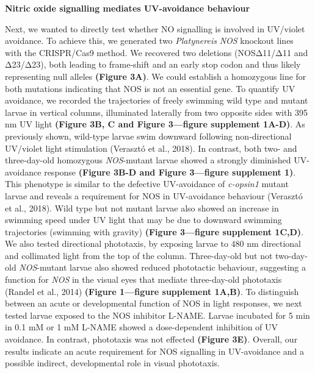\documentclass[
  10pt,
  onecolumn]{article}
\begin{document}
\textbf{Nitric oxide signalling mediates UV-avoidance behaviour}

Next, we wanted to directly test whether NO signalling is involved in
UV/violet avoidance. To achieve this, we generated two
\emph{Platynereis} \emph{NOS} knockout lines with the CRISPR/Cas9
method. We recovered two deletions (NOSΔ11/Δ11 and Δ23/Δ23), both
leading to frame-shift and an early stop codon and thus likely
representing null alleles \textbf{(Figure 3A)}. We could establish a
homozygous line for both mutations indicating that NOS is not an
essential gene. To quantify UV avoidance, we recorded the trajectories
of freely swimming wild type and mutant larvae in vertical columns,
illuminated laterally from two opposite sides with 395 nm UV light
\textbf{(Figure 3B, C and Figure 3---figure supplement 1A-D)}. As
previously shown, wild-type larvae swim downward following
non-directional UV/violet light stimulation (Verasztó et al., 2018). In
contrast, both two- and three-day-old homozygous \emph{NOS}-mutant
larvae showed a strongly diminished UV-avoidance response
\textbf{(Figure 3B-D and Figure 3---figure supplement 1)}. This
phenotype is similar to the defective UV-avoidance of \emph{c-opsin1}
mutant larvae and reveals a requirement for NOS in UV-avoidance
behaviour (Verasztó et al., 2018). Wild type but not mutant larvae also
showed an increase in swimming speed under UV light that may be due to
downward swimming trajectories (swimming with gravity) \textbf{(Figure
3---figure supplement 1C,D)}. We also tested directional phototaxis, by
exposing larvae to 480 nm directional and collimated light from the top
of the column. Three-day-old but not two-day-old \emph{NOS}-mutant
larvae also showed reduced phototactic behaviour, suggesting a function
for \emph{NOS} in the visual eyes that mediate three-day-old phototaxis
(Randel et al., 2014) \textbf{(Figure 1---figure supplement 1A,B)}. To
distinguish between an acute or developmental function of NOS in light
responses, we next tested larvae exposed to the NOS inhibitor L-NAME.
Larvae incubated for 5 min in 0.1 mM or 1 mM L-NAME showed a
dose-dependent inhibition of UV avoidance. In contrast, phototaxis was
not effected \textbf{(Figure 3E)}. Overall, our results indicate an
acute requirement for NOS signalling in UV-avoidance and a possible
indirect, developmental role in visual phototaxis.
\end{document}
